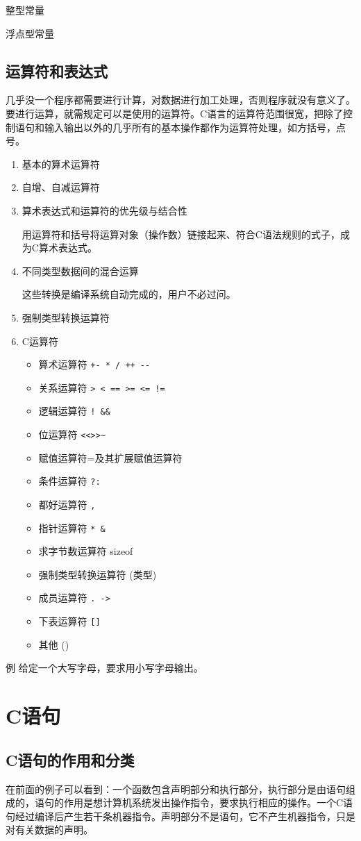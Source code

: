 整型常量

浮点型常量
\subsection{运算符和表达式}
几乎没一个程序都需要进行计算，对数据进行加工处理，否则程序就没有意义了。要进行运算，就需规定可以是使用的运算符。C语言的运算符范围很宽，把除了控制语句和输入输出以外的几乎所有的基本操作都作为运算符处理，如方括号，点号。
\begin{enumerate}
	\item 基本的算术运算符
	\item 自增、自减运算符
	\item 算术表达式和运算符的优先级与结合性

		用运算符和括号将运算对象（操作数）链接起来、符合C语法规则的式子，成为C算术表达式。
	\item 不同类型数据间的混合运算

		这些转换是编译系统自动完成的，用户不必过问。
	\item 强制类型转换运算符
	\item C运算符

		\begin{itemize}
			\item 算术运算符	\verb|+- * / ++ --|
			\item 关系运算符	\verb|> < == >= <= !=|
			\item 逻辑运算符 	\verb|! && |
			\item 位运算符		\verb|<<>>~ |
			\item 赋值运算符=及其扩展赋值运算符
			\item 条件运算符	\verb|?:|
			\item 都好运算符	\verb|,|
			\item 指针运算符	\verb|* &|
			\item 求字节数运算符	sizeof
			\item 强制类型转换运算符	(类型)
			\item 成员运算符	\verb|. ->|
			\item 下表运算符	\verb|[]|
			\item 其他  ()
		\end{itemize}
\end{enumerate}

例 给定一个大写字母，要求用小写字母输出。


\section{C语句}
\subsection{C语句的作用和分类}
在前面的例子可以看到：一个函数包含声明部分和执行部分，执行部分是由语句组成的，语句的作用是想计算机系统发出操作指令，要求执行相应的操作。一个C语句经过编译后产生若干条机器指令。声明部分不是语句，它不产生机器指令，只是对有关数据的声明。

